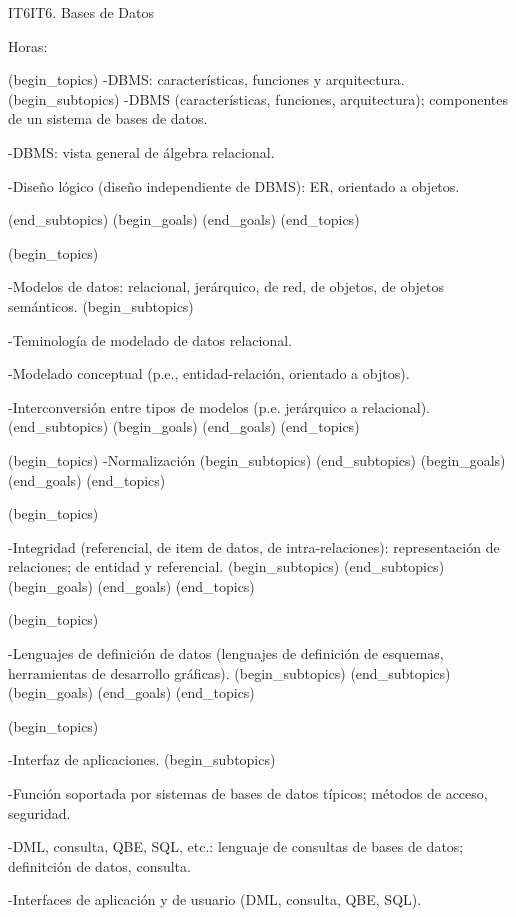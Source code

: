 \begin{BKL2}{IT6}{IT6. Bases de Datos}

Horas:
 
(begin_topics)
-DBMS: características, funciones y arquitectura.
(begin_subtopics)
-DBMS (características, funciones, arquitectura); componentes de un sistema de bases de datos.

-DBMS: vista general de álgebra relacional.

-Diseño lógico (diseño independiente de DBMS): ER, orientado a objetos.

(end_subtopics)
(begin_goals)
(end_goals)
(end_topics)

 

(begin_topics)

-Modelos de datos: relacional, jerárquico, de red, de objetos, de objetos semánticos.
(begin_subtopics)

-Teminología de modelado de datos relacional.

-Modelado conceptual (p.e., entidad-relación, orientado a objtos).

-Interconversión entre tipos de modelos (p.e. jerárquico a relacional).
(end_subtopics)
(begin_goals)
(end_goals)
(end_topics)

 

(begin_topics)
-Normalización
(begin_subtopics)
(end_subtopics)
(begin_goals)
(end_goals)
(end_topics)

 

(begin_topics)

-Integridad (referencial, de item de datos, de intra-relaciones): representación de relaciones; de entidad y referencial.
(begin_subtopics)
(end_subtopics)
(begin_goals)
(end_goals)
(end_topics)

 

(begin_topics)

-Lenguajes de definición de datos (lenguajes de definición de esquemas, herramientas de desarrollo gráficas).
(begin_subtopics)
(end_subtopics)
(begin_goals)
(end_goals)
(end_topics)

 

(begin_topics)

-Interfaz de aplicaciones.
(begin_subtopics)

-Función soportada por sistemas de bases de datos típicos; métodos de acceso, seguridad.

-DML, consulta, QBE, SQL, etc.: lenguaje de consultas de bases de datos; definitción de datos, consulta.

-Interfaces de aplicación y de usuario (DML, consulta, QBE, SQL).


\end{BKL2}
